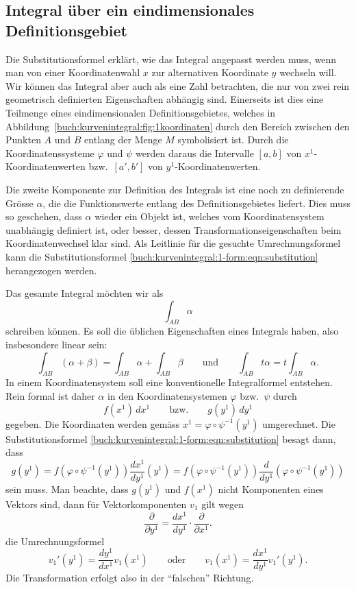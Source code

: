 \subsection{Integral über ein eindimensionales Definitionsgebiet
\label{buch:1formen:subsection:integral}}

Die Substitutionsformel erklärt, wie das Integral angepasst werden
muss, wenn man von einer Koordinatenwahl $x$ zur alternativen
Koordinate $y$ wechseln will.
Wir können das Integral aber auch als eine Zahl betrachten,
die nur von zwei rein geometrisch definierten Eigenschaften
abhängig sind.
Einerseits ist dies eine Teilmenge eines eindimensionalen
Definitionsgebietes, welches in
Abbildung~\ref{buch:kurvenintegral:fig:1koordinaten} durch
den Bereich zwischen den Punkten $A$ und $B$ entlang der Menge $M$
symbolisiert ist.
Durch die Koordinatenssysteme $\varphi$ und $\psi$ werden daraus
die Intervalle $[a,b]$ von $x^1$-Koordinatenwerten bzw.~$[a',b']$
von $y^1$-Koordinatenwerten.

Die zweite Komponente zur Definition des Integrals ist eine
noch zu definierende Grösse $\alpha$, die die Funktionswerte
entlang des Definitionsgebietes liefert.
Dies muss so geschehen, dass $\alpha$ wieder ein Objekt ist,
welches vom Koordinatensystem unabhängig definiert ist, oder 
besser, dessen Transformationseigenschaften beim Koordinatenwechsel
klar sind.
Als Leitlinie für die gesuchte Umrechnungsformel kann die
Substitutionsformel
\eqref{buch:kurvenintegral:1-form:eqn:substitution}
herangezogen werden.

Das gesamte Integral möchten wir als
\[
\int_{AB} \alpha
\]
schreiben können.
Es soll die üblichen Eigenschaften eines Integrals haben, also
insbesondere linear sein:
\[
\int_{AB}
(\alpha + \beta)
=
\int_{AB}
\alpha
+
\int_{AB}
\beta
\qquad\text{und}\qquad
\int_{AB}
t
\alpha
=
t
\int_{AB}
\alpha.
\]
In einem Koordinatensystem soll eine konventionelle Integralformel
entstehen.
Rein formal ist daher $\alpha$ in den Koordinatensystemen $\varphi$
bzw.~$\psi$ durch
\[
f(x^1)\,dx^1
\qquad
\text{bzw.}
\qquad
g(y^1)\,dy^1
\]
gegeben.
Die Koordinaten werden gemäss $x^1 = \varphi\circ\psi^{-1}(y^1)$
umgerechnet.
Die Substitutionsformel
\eqref{buch:kurvenintegral:1-form:eqn:substitution}
besagt dann, dass
\[
g(y^1)
= 
f(\varphi\circ\psi^{-1}(y^1))
\frac{dx^1}{dy^1}(y^1)
=
f(\varphi\circ\psi^{-1}(y^1))
\frac{d}{dy^1}(\varphi\circ\psi^{-1}(y^1))
\]
sein muss.
Man beachte, dass $g(y^1)$ und $f(x^1)$ nicht Komponenten eines
Vektors sind, dann für Vektorkomponenten $v_1$ gilt wegen
\[
\frac{\partial}{\partial y^1}
=
\frac{dx^1}{dy^1}\cdot \frac{\partial }{\partial x^1}.
\]
die Umrechnungsformel
\[
v_1'(y^1)
=
\frac{dy^1}{dx^1}
v_1(x^1)
\qquad\text{oder}\qquad
v_1(x^1)
=
\frac{dx^1}{dy^1} v_1'(y^1).
\]
Die Transformation erfolgt also in der ``falschen'' Richtung.

